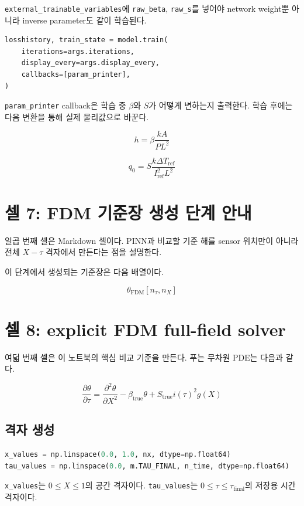 \documentclass[11pt]{article}
\begin{document}
\texttt{external\_trainable\_variables}에 \texttt{raw\_beta}, \texttt{raw\_s}를 넣어야 network weight뿐 아니라 inverse parameter도 같이 학습된다.

\begin{lstlisting}[language=Python]
losshistory, train_state = model.train(
    iterations=args.iterations,
    display_every=args.display_every,
    callbacks=[param_printer],
)
\end{lstlisting}

\texttt{param\_printer} callback은 학습 중 \(\beta\)와 \(S\)가 어떻게 변하는지 출력한다.
학습 후에는 다음 변환을 통해 실제 물리값으로 바꾼다.

\[
h = \beta \frac{kA}{PL^2}
\]

\[
q_0 = S \frac{k \Delta T_{\mathrm{ref}}}{I_{\mathrm{ref}}^2 L^2}
\]

\section{셀 7: FDM 기준장 생성 단계 안내}

일곱 번째 셀은 Markdown 셀이다.
PINN과 비교할 기준 해를 sensor 위치만이 아니라 전체 \(X-\tau\) 격자에서 만든다는 점을 설명한다.

이 단계에서 생성되는 기준장은 다음 배열이다.

\[
\theta_{\mathrm{FDM}}[n_{\tau}, n_X]
\]

\section{셀 8: explicit FDM full-field solver}

여덟 번째 셀은 이 노트북의 핵심 비교 기준을 만든다.
푸는 무차원 PDE는 다음과 같다.

\[
\frac{\partial \theta}{\partial \tau}
=
\frac{\partial^2 \theta}{\partial X^2}
- \beta_{\mathrm{true}} \theta
+ S_{\mathrm{true}} i(\tau)^2 g(X)
\]

\subsection*{격자 생성}

\begin{lstlisting}[language=Python]
x_values = np.linspace(0.0, 1.0, nx, dtype=np.float64)
tau_values = np.linspace(0.0, m.TAU_FINAL, n_time, dtype=np.float64)
\end{lstlisting}

\texttt{x\_values}는 \(0 \le X \le 1\)의 공간 격자이다.
\texttt{tau\_values}는 \(0 \le \tau \le \tau_{\mathrm{final}}\)의 저장용 시간 격자이다.
\end{document}
